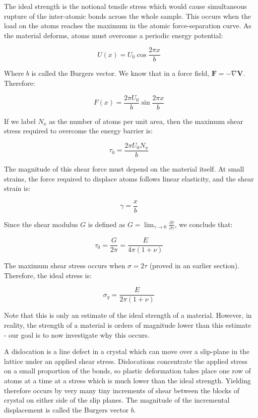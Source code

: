 \documentclass{article}
\begin{document}
\begin{proposition}
    The ideal strength is the notional tensile stress which would cause simultaneous rupture of the inter-atomic bonds across the whole sample.  This occurs when the load on the atoms reaches the maximum in the atomic force-separation curve. As the material deforms, atoms must overcome a periodic energy potential:

    \[ U(x) = U_0\cos{\frac{2\pi x}{b}} \]

    Where $b$ is called the Burgers vector. We know that in a force field, $\mathbf{F} = -\nabla\mathbf{V}$. Therefore:

    \[ F(x) = \frac{2\pi U_0}{b}\sin{\frac{2\pi x}{b}} \]

    If we label $N_x$ as the number of atoms per unit area, then the maximum shear stress required to overcome the energy barrier is:

    \[ \tau_0 = \frac{2\pi U_0N_x}{b} \]

    The magnitude of this shear force must depend on the material itself. At small strains, the force required to displace atoms follows linear elasticity, and the shear strain is:

    \[ \gamma = \frac{x}{b} \]

    Since the shear modulus $G$ is defined as $G = \lim_{\gamma \to 0} \frac{\partial\tau}{\partial\gamma}$, we conclude that:

    \[ \tau_0 = \frac{G}{2\pi} = \frac{E}{4\pi(1 + \nu)} \]

    The maximum shear stress occurs when $\sigma = 2\tau$ (proved in an earlier section). Therefore, the ideal stress is:

    \[ \sigma_y = \frac{E}{2\pi(1 + \nu)} \]
\end{proposition}

Note that this is only an estimate of the ideal strength of a material. However, in reality, the strength of a material is orders of magnitude lower than this estimate - our goal is to now investigate why this occurs.

\begin{definition}[Dislocations]
    A dislocation is a line defect in a crystal which can move over a slip-plane in the lattice under an applied shear stress.  Dislocations concentrate the applied stress on a small proportion of the bonds, so plastic deformation takes place one row of atoms at a time at a stress which is much lower than the ideal strength. Yielding therefore occurs by very many tiny increments of shear between the blocks of crystal on either side of the slip planes.  The magnitude of the incremental displacement is called the Burgers vector $b$. 
\end{definition}
\end{document}
